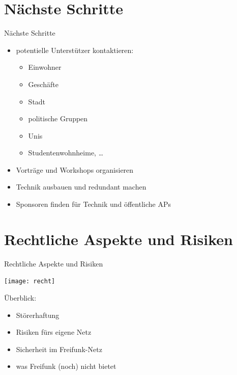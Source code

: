 \documentclass{beamer}
\begin{document}
\section{Nächste Schritte}
\begin{frame}{Nächste Schritte}
\vfill
\begin{itemize}
\pause\item potentielle Unterstützer kontaktieren:
	\begin{itemize}
		\pause\item Einwohner
		\pause\item Geschäfte
		\pause\item Stadt
		\pause\item politische Gruppen
		\pause\item Unis
		\pause\item Studentenwohnheime, \ldots
	\end{itemize}
\pause\item Vorträge und Workshops organisieren
\pause\item Technik ausbauen und redundant machen
\pause\item Sponsoren finden für Technik und öffentliche APs
\end{itemize}
\vfill
\end{frame}

\section{Rechtliche Aspekte und Risiken}
\begin{frame}{Rechtliche Aspekte und Risiken}
\begin{Row}
\begin{Cell}{1}
\vspace{0.1cm}
\texttt{[image: recht]}
\end{Cell}
\begin{Cell}{2}
\vspace{1cm}
Überblick:
\begin{itemize}
\pause \item Störerhaftung
\pause \item Risiken fürs eigene Netz
\pause \item Sicherheit im Freifunk-Netz
\pause \item was Freifunk (noch) nicht bietet
\end{itemize}
\end{Cell}
\end{Row}
\end{frame}
\end{document}
